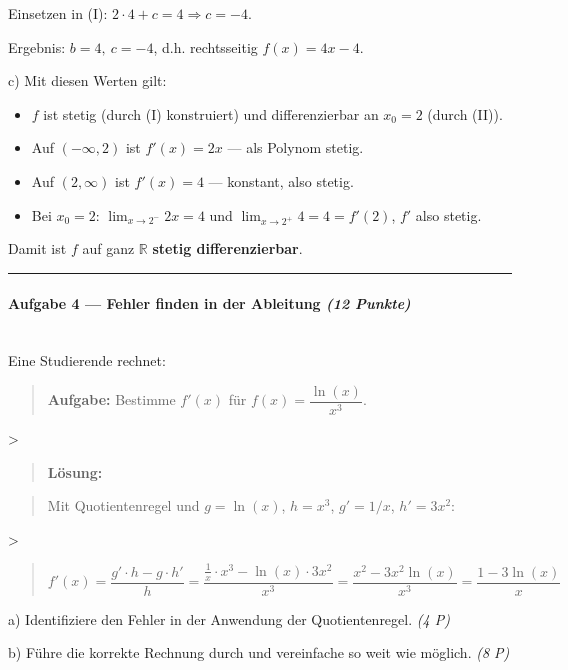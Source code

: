\documentclass[11pt, a4paper]{article}
\begin{document}
Einsetzen in (I): $2\cdot 4 + c = 4 \Rightarrow c = -4$.


Ergebnis: $\boxed{b = 4,\ c = -4}$, d.h. rechtsseitig $f(x) = 4x - 4$.


c) Mit diesen Werten gilt:

\begin{itemize}
  \item $f$ ist stetig (durch (I) konstruiert) und differenzierbar an $x_0=2$ (durch (II)).
  \item Auf $(-\infty, 2)$ ist $f'(x) = 2x$ — als Polynom stetig.
  \item Auf $(2, \infty)$ ist $f'(x) = 4$ — konstant, also stetig.
  \item Bei $x_0 = 2$: $\lim_{x\to 2^-} 2x = 4$ und $\lim_{x\to 2^+} 4 = 4 = f'(2)$, $f'$ also stetig.
\end{itemize}

Damit ist $f$ auf ganz $\mathbb{R}$ \textbf{stetig differenzierbar}.



\noindent\textcolor{rulegray}{\rule{\linewidth}{0.4pt}}


\paragraph{Aufgabe 4 — Fehler finden in der Ableitung \textit{(12 Punkte)}}\mbox{}\\[2pt]

Eine Studierende rechnet:


\begin{quote}
\textbf{Aufgabe:} Bestimme $f'(x)$ für $f(x) = \dfrac{\ln(x)}{x^3}$.
\end{quote}
>

\begin{quote}
\textbf{Lösung:}
\end{quote}
\begin{quote}
Mit Quotientenregel und $g = \ln(x)$, $h = x^3$, $g' = 1/x$, $h' = 3x^2$:
\end{quote}
>

\begin{quote}
$f'(x) = \dfrac{g'\cdot h - g\cdot h'}{h} = \dfrac{\frac{1}{x}\cdot x^3 - \ln(x)\cdot 3x^2}{x^3} = \dfrac{x^2 - 3x^2\ln(x)}{x^3} = \dfrac{1 - 3\ln(x)}{x}$
\end{quote}

a) Identifiziere den Fehler in der Anwendung der Quotientenregel. \textit{(4 P)}

b) Führe die korrekte Rechnung durch und vereinfache so weit wie möglich. \textit{(8 P)}
\end{document}
